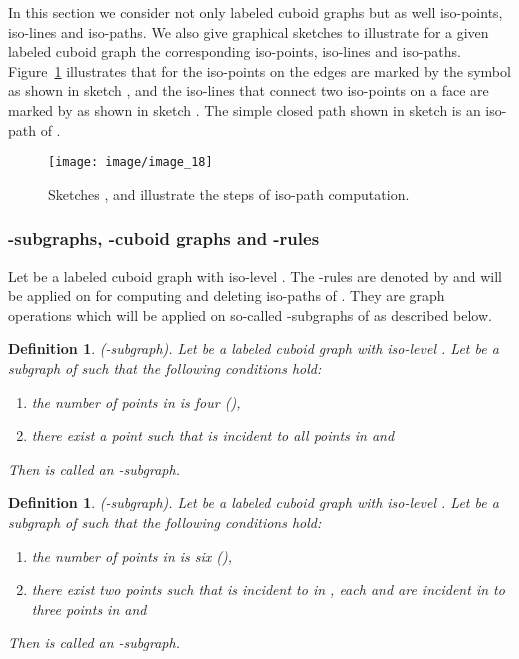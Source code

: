 \documentclass[a4paper,11pt]{article}
\newtheorem{definition}[theorem]{Definition}
\begin{document}
In this section we consider not only labeled cuboid graphs but as well iso-points, iso-lines and iso-paths.
We also give graphical sketches to illustrate for a given labeled cuboid graph the corresponding iso-points,
iso-lines and iso-paths. Figure~\ref{image_18} illustrates that for 
the iso-points on the edges are marked by the symbol  as shown in sketch , and the iso-lines
that connect two iso-points on a face are marked by \!\textminus\!\textminus\!
as shown in sketch . The simple closed path shown in sketch  is an iso-path of .
\begin{figure}[!ht]
\texttt{[image: image/image\_18]}
\caption{Sketches ,  and  illustrate the steps of iso-path computation.}
\label{image_18}
\end{figure}
\FloatBarrier
\subsubsection{-subgraphs, -cuboid graphs and -rules}
Let  be a labeled cuboid graph with iso-level . The -rules are denoted
by  and will be applied on  for computing and deleting iso-paths of
. They are graph operations which will be applied on so-called -subgraphs of  as described below.

\begin{definition}(-subgraph). Let  be a labeled cuboid graph
with iso-level . Let  be a subgraph of  such that the following
conditions hold:
\begin{enumerate}
\item the number of points in  is four (),
\item there exist a point  such that  is incident to all points  in  and

\end{enumerate}
Then  is called an -subgraph.
\label{def:iso-path-10}
\end{definition}

\begin{definition}(-subgraph). Let  be a labeled cuboid graph
with iso-level . Let  be a subgraph of  such that the following
conditions hold:
\begin{enumerate}
\item the number of points in  is six (),
\item there exist two points  such that  is incident to  in ,
each  and  are incident in  to three points in  and

\end{enumerate}
Then  is called an -subgraph.
\label{def:iso-path-11}
\end{definition}
\end{document}
